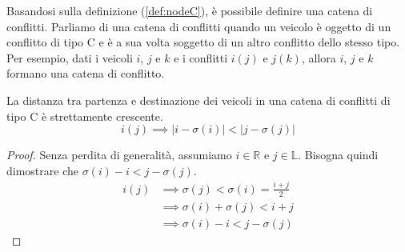 \documentclass[../../../relazione.tex]{subfiles}
\begin{document}
Basandosi sulla definizione (\ref{def:nodeC}), è possibile definire una catena di conflitti.
Parliamo di una catena di conflitti quando un veicolo è oggetto di un conflitto di tipo C e è a sua volta soggetto di un altro conflitto dello stesso tipo.
Per esempio, dati i veicoli $i$, $j$ e $k$ e i conflitti $i(j)$ e $j(k)$, allora $i$, $j$ e $k$ formano una catena di conflitto.

\begin{theorem}
  La distanza tra partenza e destinazione dei veicoli in una catena di conflitti di tipo C è strettamente crescente.
  \[i(j) \implies \left|i-\sigma(i)\right| < \left|j-\sigma(j)\right|\]
\end{theorem}
\begin{proof}
  Senza perdita di generalità, assumiamo $i \in \mathbb{R}$ e $j \in \mathbb{L}$.
  Bisogna quindi dimostrare che $\sigma(i) - i < j - \sigma(j)$.
  \begin{equation*}
    \begin{split}
      i(j) & \implies \sigma(j) < \sigma(i) = \frac{i+j}{2} \\
      & \implies \sigma(i) + \sigma(j) < i + j \\
      & \implies \sigma(i) - i < j - \sigma(j)
    \end{split}
  \end{equation*}
\end{proof}
\end{document}
